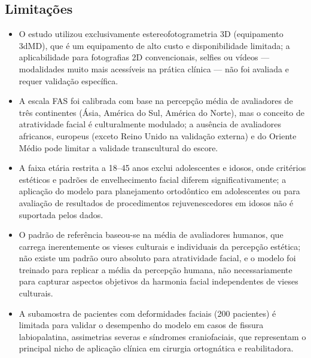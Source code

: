 \subsection{Limitações}
\begin{itemize}
  \item O estudo utilizou exclusivamente estereofotogrametria 3D
        (equipamento 3dMD), que é um equipamento de alto custo e
        disponibilidade limitada; a aplicabilidade para fotografias
        2D convencionais, selfies ou vídeos --- modalidades muito
        mais acessíveis na prática clínica --- não foi avaliada e
        requer validação específica.
  \item A escala FAS foi calibrada com base na percepção média de
        avaliadores de três continentes (Ásia, América do Sul,
        América do Norte), mas o conceito de atratividade facial
        é culturalmente modulado; a ausência de avaliadores
        africanos, europeus (exceto Reino Unido na validação
        externa) e do Oriente Médio pode limitar a validade
        transcultural do escore.
  \item A faixa etária restrita a 18--45 anos exclui adolescentes
        e idosos, onde critérios estéticos e padrões de
        envelhecimento facial diferem significativamente; a
        aplicação do modelo para planejamento ortodôntico em
        adolescentes ou para avaliação de resultados de
        procedimentos rejuvenescedores em idosos não é suportada
        pelos dados.
  \item O padrão de referência baseou-se na média de avaliadores
        humanos, que carrega inerentemente os vieses culturais e
        individuais da percepção estética; não existe um padrão
        ouro absoluto para atratividade facial, e o modelo foi
        treinado para replicar a média da percepção humana, não
        necessariamente para capturar aspectos objetivos da
        harmonia facial independentes de vieses culturais.
  \item A subamostra de pacientes com deformidades faciais (200
        pacientes) é limitada para validar o desempenho do modelo
        em casos de fissura labiopalatina, assimetrias severas e
        síndromes craniofaciais, que representam o principal nicho
        de aplicação clínica em cirurgia ortognática e
        reabilitadora.
\end{itemize}

